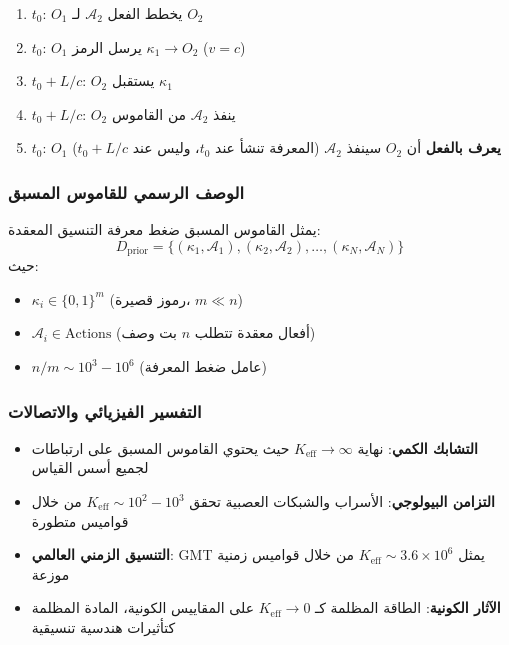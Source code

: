 \documentclass[11pt,a4paper]{article}
\begin{document}
	\begin{enumerate}[label=\arabic*.]
		\item $t_0$: $O_1$ يخطط الفعل $\mathcal{A}_2$ لـ $O_2$
		\item $t_0$: $O_1$ يرسل الرمز $\kappa_1 \to O_2$ ($v = c$)
		\item $t_0 + L/c$: $O_2$ يستقبل $\kappa_1$
		\item $t_0 + L/c$: $O_2$ ينفذ $\mathcal{A}_2$ من القاموس
		\item $t_0$: $O_1$ \textbf{يعرف بالفعل} أن $O_2$ سينفذ $\mathcal{A}_2$ (المعرفة تنشأ عند $t_0$، وليس عند $t_0 + L/c$)
	\end{enumerate}
	
	\subsubsection{الوصف الرسمي للقاموس المسبق}
	يمثل القاموس المسبق ضغط معرفة التنسيق المعقدة:
	\begin{equation}
		D_{\text{prior}} = \{(\kappa_1, \mathcal{A}_1), (\kappa_2, \mathcal{A}_2), \dots, (\kappa_N, \mathcal{A}_N)\}
	\end{equation}
	حيث:
	\begin{itemize}
		\item $\kappa_i \in \{0,1\}^m$ (رموز قصيرة، $m \ll n$)
		\item $\mathcal{A}_i \in \text{Actions}$ (أفعال معقدة تتطلب $n$ بت وصف)
		\item $n/m \sim 10^3-10^6$ (عامل ضغط المعرفة)
	\end{itemize}
	
	\subsubsection{التفسير الفيزيائي والاتصالات}
	\begin{itemize}
		\item \textbf{التشابك الكمي}: نهاية $K_{\mathrm{eff}} \to \infty$ حيث يحتوي القاموس المسبق على ارتباطات لجميع أسس القياس
		\item \textbf{التزامن البيولوجي}: الأسراب والشبكات العصبية تحقق $K_{\mathrm{eff}} \sim 10^2-10^3$ من خلال قواميس متطورة
		\item \textbf{التنسيق الزمني العالمي}: GMT يمثل $K_{\mathrm{eff}} \sim 3.6\times10^6$ من خلال قواميس زمنية موزعة
		\item \textbf{الآثار الكونية}: الطاقة المظلمة كـ $K_{\mathrm{eff}} \to 0$ على المقاييس الكونية، المادة المظلمة كتأثيرات هندسية تنسيقية
	\end{itemize}
	
\end{document}
